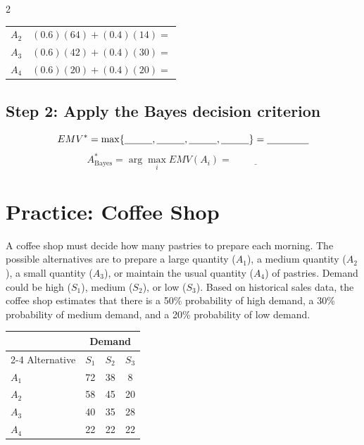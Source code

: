 \begin{multicols}{2}
\begin{center}
\begin{tabular}{lc}
				$A_2$
				&
				$(0.6)(64)+(0.4)(14)
				=$
				\underline{\hspace{1.2cm}}
				\\[4pt]
				
				$A_3$
				&
				$(0.6)(42)+(0.4)(30)
				=$
				\underline{\hspace{1.2cm}}
				\\[4pt]
				
				$A_4$
				&
				$(0.6)(20)+(0.4)(20)
				=$
				\underline{\hspace{1.2cm}}
				\\
				\bottomrule
			\end{tabular}
		\end{center}
		
		\subsection*{Step 2: Apply the Bayes decision criterion}
		
		\[
		EMV^*
		=
		\max\{
		\underline{\hspace{1cm}},
		\underline{\hspace{1cm}},
		\underline{\hspace{1cm}},
		\underline{\hspace{1cm}}
		\}
		=
		\underline{\hspace{1.5cm}}
		\]
		\[
		A^*_{\mathrm{Bayes}}
		=
		\arg\max_i EMV(A_i)
		=
		\underline{\hspace{2cm}}
		\]
		
	\section{Practice: Coffee Shop}\vspace{-2mm}
	A coffee shop must decide how many pastries to prepare each morning.
	The possible alternatives are to 
	prepare a large quantity ($A_1$), 
	a medium quantity ($A_2$), 
	a small quantity ($A_3$),
	 or maintain the usual quantity ($A_4$) of pastries.	
	Demand could be high ($S_1$), medium ($S_2$), or low ($S_3$).
	Based on historical sales data, the coffee shop estimates that there is
	a 50\% probability of high demand, a 30\% probability of medium demand,
	and a 20\% probability of low demand.\vspace{-4mm}
	
	\begin{center}
		\renewcommand{\arraystretch}{1.3}
		\small
		\begin{tabular}{lccc}
			\toprule
			& \multicolumn{3}{c}{Demand} \\
			\cmidrule(lr){2-4}
			Alternative & $S_1$ & $S_2$ & $S_3$ \\
			\midrule
			$A_1$ & 72 & 38 & 8 \\
			$A_2$ & 58 & 45 & 20 \\
			$A_3$ & 40 & 35 & 28 \\
			$A_4$ & 22 & 22 & 22 \\
			\bottomrule
		\end{tabular}
	\end{center}
	

\end{multicols}
